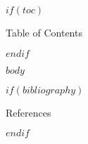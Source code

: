 \documentclass[fontset=fandol,envcountsect]{ctexbeamer}
\title$if(shorttitle)$[$shorttitle$]$endif${$title$$if(thanks)$\thanks{$thanks$}$endif$}
\subtitle$if(shortsubtitle)$[$shortsubtitle$]$endif${$subtitle$}
\author$if(shortauthor)$[$shortauthor$]$endif${$for(author)$$author$$sep$ \and $endfor$}
\date$if(shortdate)$[$shortdate$]$endif${$date$$if(date-modified)$\thanks{\transmodified \space $date-modified$.}$endif$}
\institute$if(shortinstitute)$[$shortinstitute$]$endif${$for(institute)$$institute$$sep$ \and $endfor$}
\def\transtoc{目录}
\def\transreferences{参考文献}
\def\transtoc{Table of Contents}
\def\transreferences{References}
\theoremstyle{theorem}
\theoremstyle{example}
\theoremstyle{remark}
\theoremstyle{theorem}
\theoremstyle{example}
\theoremstyle{remark}
\begin{document}
\frame{\titlepage}

$if(toc)$
\begin{frame}{\transtoc}
  \tableofcontents
\end{frame}
$endif$

$body$

$if(bibliography)$
\begin{frame}[allowframebreaks]{\transreferences}
    \printbibliography[heading=none]
\end{frame}
$endif$
\end{document}

